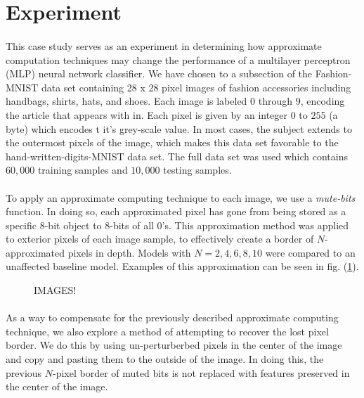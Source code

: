 \documentclass[12pt,letterpaper]{article}
\begin{document}

\section*{Experiment}

\paragraph*{}This case study serves as an experiment in determining how approximate computation techniques may change the performance of a multilayer perceptron (MLP) neural network classifier. We have chosen to a subsection of the Fashion-MNIST data set containing 28 x 28 pixel images of fashion accessories including handbags, shirts, hats, and shoes. Each image is labeled $0$ through $9$, encoding the article that appears with in. Each pixel is given by an integer $0$ to $255$ (a byte) which encodes t it's grey-scale value. In most cases, the subject extends to the outermost pixels of the image, which makes this data set favorable to the hand-written-digits-MNIST data set. The full data set was used which contains $60,000$ training samples and $10,000$ testing samples.

\paragraph*{}To apply an approximate computing technique to each image, we use a \textit{mute-bits} function. In doing so, each approximated pixel has gone from being stored as a specific $8$-bit object to $8$-bits of all $0$'s. This approximation method was applied to exterior pixels of each image sample, to effectively create a border of $N$-approximated pixels in depth. Models with $N = 2,4,6,8,10$ were compared to an unaffected baseline model. Examples of this approximation can be seen in fig. (\ref{images}).


\begin{figure}[h]
\label{images}
IMAGES!
\end{figure}


\paragraph*{}As a way to compensate for the previously described approximate computing technique, we also explore a method of attempting to recover the lost pixel border. We do this by using un-perturberbed pixels in the center of the image and copy and pasting them to the outside of the image. In doing this, the previous $N$-pixel border of muted bits is not replaced with features preserved in the center of the image. 
\end{document}
